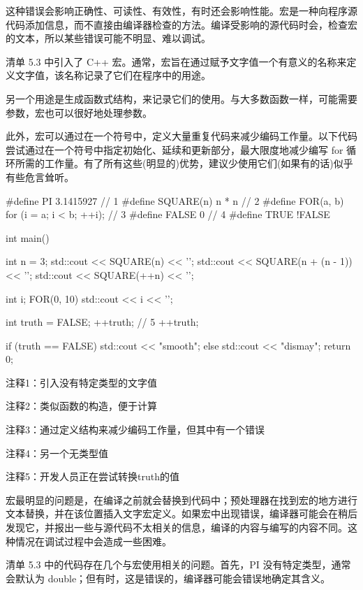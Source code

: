这种错误会影响正确性、可读性、有效性，有时还会影响性能。宏是一种向程序源代码添加信息，而不直接由编译器检查的方法。编译受影响的源代码时会，检查宏的文本，所以某些错误可能不明显、难以调试。


清单 5.3 中引入了 C++ 宏。通常，宏旨在通过赋予文字值一个有意义的名称来定义文字值，该名称记录了它们在程序中的用途。

另一个用途是生成函数式结构，来记录它们的使用。与大多数函数一样，可能需要参数，宏也可以很好地处理参数。

此外，宏可以通过在一个符号中，定义大量重复代码来减少编码工作量。以下代码尝试通过在一个符号中指定初始化、延续和更新部分，最大限度地减少编写 for 循环所需的工作量。有了所有这些(明显的)优势，建议少使用它们(如果有的话)似乎有些危言耸听。


\begin{cpp}
#define PI 3.1415927 // 1
#define SQUARE(n) n * n // 2
#define FOR(a, b) for (i = a; i < b; ++i); // 3
#define FALSE 0 // 4
#define TRUE !FALSE

int main() {
  int n = 3;
  std::cout << SQUARE(n) << '\n';
  std::cout << SQUARE(n + (n - 1)) << '\n';
  std::cout << SQUARE(++n) << '\n';

  int i;
  FOR(0, 10)
    std::cout << i << '\n';

  int truth = FALSE;
  ++truth; // 5
  ++truth;

  if (truth == FALSE)
    std::cout << "smooth\n";
  else
    std::cout << "dismay\n";
  return 0;
}
\end{cpp}

{\footnotesize
注释1：引入没有特定类型的文字值

注释2：类似函数的构造，便于计算

注释3：通过定义结构来减少编码工作量，但其中有一个错误

注释4：另一个无类型值

注释5：开发人员正在尝试转换truth的值
}


宏最明显的问题是，在编译之前就会替换到代码中；预处理器在找到宏的地方进行文本替换，并在该位置插入文字宏定义。如果宏中出现错误，编译器可能会在稍后发现它，并报出一些与源代码不太相关的信息，编译的内容与编写的内容不同。这种情况在调试过程中会造成一些困难。

清单 5.3 中的代码存在几个与宏使用相关的问题。首先，PI 没有特定类型，通常会默认为 double；但有时，这是错误的，编译器可能会错误地确定其含义。

